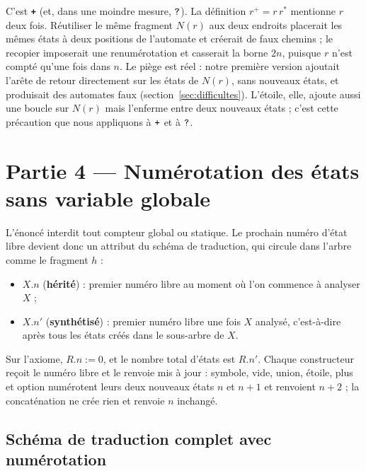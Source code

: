 \documentclass[12pt,a4paper]{article}
\newcommand{\tok}[1]{\ensuremath{\text{\fontsize{10}{12}\selectfont\ttfamily #1}}}
\begin{document}
C'est \textbf{\texttt{+}} (et, dans une moindre mesure, \tok{?}). La définition
$r^+ = r\,r^*$ mentionne $r$ deux fois. Réutiliser le même fragment $N(r)$ aux deux endroits
placerait les mêmes états à deux positions de l'automate et créerait de faux chemins ; le
recopier imposerait une renumérotation et casserait la borne $2n$, puisque $r$ n'est compté
qu'une fois dans $n$. Le piège est réel : notre première version ajoutait l'arête de retour
directement sur les états de $N(r)$, sans nouveaux états, et produisait des automates faux
(section~\ref{sec:difficultes}). L'étoile, elle, ajoute aussi une boucle sur $N(r)$ mais
l'enferme entre deux nouveaux états ; c'est cette précaution que nous appliquons à \tok{+} et
à \tok{?}.

\section{Partie 4 --- Numérotation des états sans variable globale}\label{sec:partie4}

L'énoncé interdit tout compteur global ou statique. Le prochain numéro d'état libre devient
donc un attribut du schéma de traduction, qui circule dans l'arbre comme le fragment $h$ :
\begin{itemize}
\item $X.n$ (\textbf{hérité}) : premier numéro libre au moment où l'on commence à analyser $X$ ;
\item $X.n'$ (\textbf{synthétisé}) : premier numéro libre une fois $X$ analysé, c'est-à-dire
  après tous les états créés dans le sous-arbre de $X$.
\end{itemize}
Sur l'axiome, $R.n := 0$, et le nombre total d'états est $R.n'$. Chaque constructeur reçoit le
numéro libre et le renvoie mis à jour : symbole, vide, union, étoile, plus et option numérotent
leurs deux nouveaux états $n$ et $n+1$ et renvoient $n+2$ ; la concaténation ne crée rien et
renvoie $n$ inchangé.

\subsection{Schéma de traduction complet avec numérotation}
\end{document}

